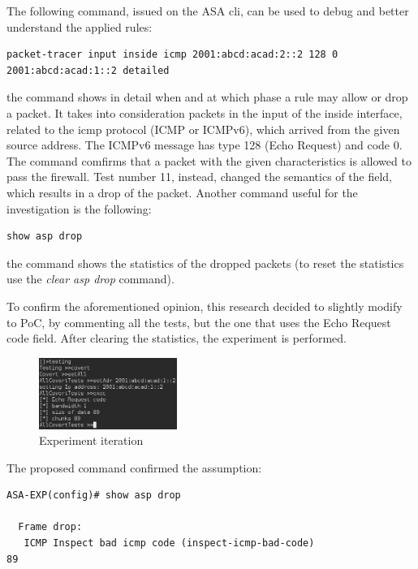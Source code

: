 \documentclass[12pt]{article}
\begin{document}
The following command, issued on the ASA cli, can be used to debug and better understand the applied rules:

\begin{lstlisting}[style=python,basicstyle=\ttfamily\small]
 packet-tracer input inside icmp 2001:abcd:acad:2::2 128 0 2001:abcd:acad:1::2 detailed
\end{lstlisting}

the command shows in detail when and at which phase a rule may allow or drop a packet. It takes into consideration packets in the input of the inside interface, related to the icmp protocol (ICMP or ICMPv6), which arrived from the given source address. The ICMPv6 message has type 128 (Echo Request) and code 0. The command comfirms that a packet with the given characteristics is allowed to pass the firewall. Test number 11, instead, changed the semantics of the field, which results in a drop of the packet. Another command useful for the investigation is the following:

\begin{lstlisting}[style=python,basicstyle=\ttfamily\small]
 show asp drop
\end{lstlisting}

the command shows the statistics of the dropped packets (to reset the statistics use the \textit{clear asp drop} command).

To confirm the aforementioned opinion, this research decided to slightly modify to PoC, by commenting all the tests, but the one that uses the Echo Request code field. After clearing the statistics, the experiment is performed. 

\begin{figure}[ht] 
\begin{center}
\includegraphics[width=0.4\textwidth]{echoCodeOnly}
\caption{Experiment iteration}
\label{fig:expIteration}
\end{center}
\end{figure}

The proposed command confirmed the assumption:

\begin{lstlisting}[style=python,basicstyle=\ttfamily\small]
 ASA-EXP(config)# show asp drop

  Frame drop:
   ICMP Inspect bad icmp code (inspect-icmp-bad-code)                          89
\end{lstlisting}
\end{document}
